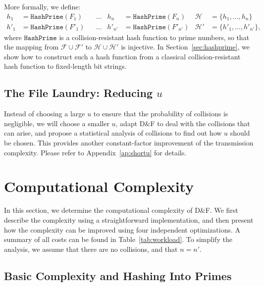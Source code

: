 \documentclass[twoside,envcountsame,runningheads]{llncs}
\newcommand{\Set}{\mathcal{H}}
\newcommand{\Files}{\mathcal{F}}
\newcommand{\df}{D\&F\xspace}
\newcommand{\HashPrime}{\ensuremath{\mathtt{HashPrime}}}
\newcommand{\apref}[1]{Appendix~\ref{#1}}
\newcommand{\apref}[1]{the full version~TODO}
\begin{document}
More formally, we define:
\begin{align*}
h_1 &= \HashPrime(F_1) & &\dots & h_n &= \HashPrime(F_n) & \Set &= \{h_1,\dots,h_n\} \\
h'_1 &= \HashPrime(F'_1) & &\dots & h'_{n'} &= \HashPrime(F'_{n'}) & \Set' &= \{h'_1,\dots,h'_{n'}\},
\end{align*}
where $\HashPrime$ is a collision-resistant hash function to prime numbers, so that the mapping from $\Files \cup \Files'$ to $\Set \cup \Set'$ is injective.
In Section~\ref{sec:hashprime}, we show how to construct such a hash function from a classical collision-resistant hash function to fixed-length bit strings.

\subsection{The File Laundry: Reducing $u$}
\label{sec:shortu}

Instead of choosing a large $u$ to ensure that the probability of collisions is negligible, we will choose a smaller $u$, adapt \df to deal with the collisions that can arise, and propose a statistical analysis of collisions to find out how $u$ should be chosen.
This provides another constant-factor improvement of the transmission complexity. Please refer to \apref{ap:shortu} for details.

\section{Computational Complexity}
\label{sec:comp}
In this section, we determine the computational complexity of \df. We first describe the complexity using a straightforward implementation, and then present how the complexity can be improved using four independent optimizations. A summary of all costs can be found in Table~\ref{tab:workload}.
To simplify the analysis, we assume that there are no collisions, and that $n=n'$.


\subsection{Basic Complexity and Hashing Into Primes}
\label{sec:basiccomp}
\label{sec:hashprime}
\end{document}
